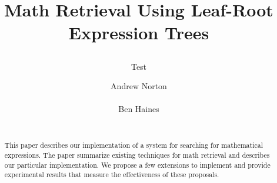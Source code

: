 \documentclass{sig-alternate}
\begin{document}
%

\title{Math Retrieval Using Leaf-Root Expression Trees
\subtitle{Test}}

%
\author{
%
%
\alignauthor
Andrew Norton
       \\
       \\
\alignauthor
Ben Haines
       \\
       \\
}

\maketitle
\begin{abstract}
This paper describes our implementation of a system for
searching for mathematical expressions. The paper summarize
existing techniques for math retrieval and describes our particular
implementation. We propose a few extensions to implement and 
provide experimental results that measure the effectiveness of
these proposals.
\end{abstract}
\end{document}
